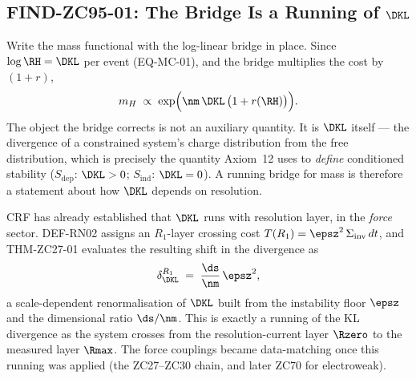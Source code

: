 \documentclass[12pt, a4paper]{article}
\begin{document}

\subsection{FIND-ZC95-01: The Bridge Is a Running of \texorpdfstring{$\DKL$}{D\_KL}}
\label{sec:gift-zc95}

Write the mass functional with the log-linear bridge in place. Since
$\log\RH=\DKL$ per event (EQ-MC-01), and the bridge multiplies the cost by
$(1+r)$,
\[
  m_H \;\propto\; \exp\!\Big(\nm\,\DKL\,\big(1+r(\RH)\big)\Big).
\]
The object the bridge corrects is not an auxiliary quantity. It is $\DKL$ itself
--- the divergence of a constrained system's charge distribution from the free
distribution, which is precisely the quantity Axiom~12 uses to \emph{define}
conditioned stability ($S_{\mathrm{dep}}$: $\DKL>0$; $S_{\mathrm{ind}}$:
$\DKL=0$). A running bridge for mass is therefore a statement about how $\DKL$
depends on resolution.

\begin{genealogybox}[title={The mechanism already exists --- for forces}]
CRF has already established that $\DKL$ runs with resolution layer, in the
\emph{force} sector. DEF-RN02 assigns an $R_1$-layer crossing cost
$T(R_1)=\epsz^2\,\Sigma_{\mathrm{inv}}\,dt$, and THM-ZC27-01 evaluates the
resulting shift in the divergence as
\[
  \delta_{\DKL}^{R_1} \;=\; \frac{\ds}{\nm}\,\epsz^{2},
\]
a scale-dependent renormalisation of $\DKL$ built from the instability floor
$\epsz$ and the dimensional ratio $\ds/\nm$. This is exactly a running of the KL
divergence as the system crosses from the resolution-current layer $\Rzero$ to
the measured layer $\Rmax$. The force couplings became data-matching once this
running was applied (the ZC27--ZC30 chain, and later ZC70 for electroweak).
\end{genealogybox}
\end{document}
